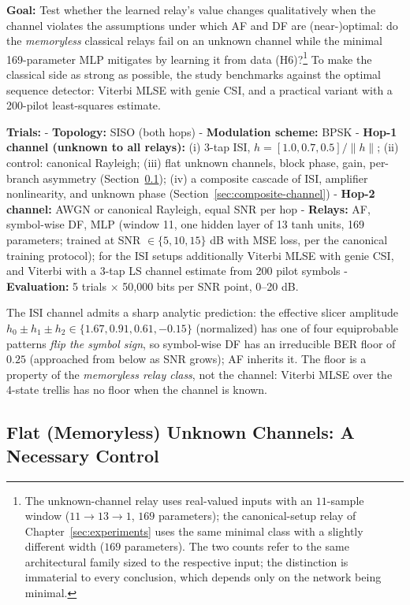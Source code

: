 \textbf{Goal:} Test whether the learned relay's value changes qualitatively when the channel violates the assumptions under which AF and DF are (near-)optimal: do the \emph{memoryless} classical relays fail on an unknown channel while the minimal 169-parameter MLP mitigates by learning it from data (H6)?\footnote{The unknown-channel relay uses real-valued inputs with an $11$-sample window ($11 \to 13 \to 1$, $169$ parameters); the canonical-setup relay of Chapter~\ref{sec:experiments} uses the same minimal class with a slightly different width ($169$ parameters). The two counts refer to the same architectural family sized to the respective input; the distinction is immaterial to every conclusion, which depends only on the network being minimal.} To make the classical side as strong as possible, the study benchmarks against the optimal sequence detector: Viterbi MLSE \cite{Forney1972MLSE} with genie CSI, and a practical variant with a 200-pilot least-squares estimate.

\textbf{Trials:} - \textbf{Topology:} SISO (both hops) - \textbf{Modulation scheme:} BPSK - \textbf{Hop-1 channel (unknown to all relays):} (i) 3-tap ISI, $h = [1.0, 0.7, 0.5]/\lVert h\rVert$; (ii) control: canonical Rayleigh; (iii) flat unknown channels, block phase, gain, per-branch asymmetry (Section~\ref{sec:flat-unknown-channels}); (iv) a composite cascade of ISI, amplifier nonlinearity, and unknown phase (Section~\ref{sec:composite-channel}) - \textbf{Hop-2 channel:} AWGN or canonical Rayleigh, equal SNR per hop - \textbf{Relays:} AF, symbol-wise DF, MLP (window 11, one hidden layer of 13 tanh units, 169 parameters; trained at SNR $\in \{5,10,15\}$ dB with MSE loss, per the canonical training protocol); for the ISI setups additionally Viterbi MLSE with genie CSI, and Viterbi with a 3-tap LS channel estimate from 200 pilot symbols - \textbf{Evaluation:} 5 trials $\times$ 50{,}000 bits per SNR point, 0--20 dB.

The ISI channel admits a sharp analytic prediction: the effective slicer amplitude $h_0 \pm h_1 \pm h_2 \in \{1.67, 0.91, 0.61, -0.15\}$ (normalized) has one of four equiprobable patterns \emph{flip the symbol sign}, so symbol-wise DF has an irreducible BER floor of $0.25$ (approached from below as SNR grows); AF inherits it. The floor is a property of the \emph{memoryless relay class}, not the channel: Viterbi MLSE over the 4-state trellis has no floor when the channel is known.


\subsection{Flat (Memoryless) Unknown Channels: A Necessary Control}\label{sec:flat-unknown-channels}

